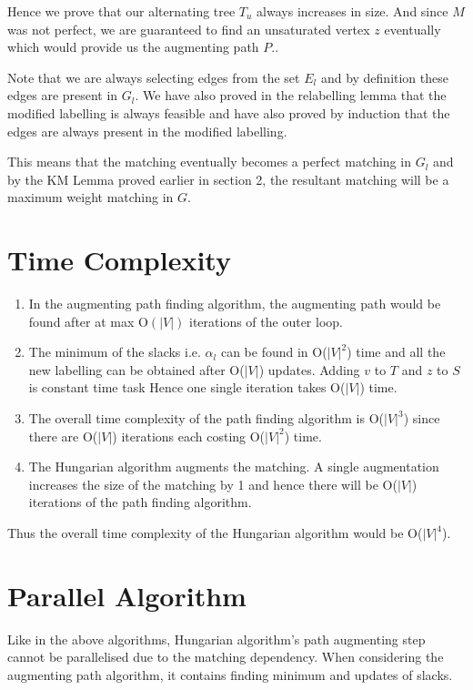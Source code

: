 Hence we prove that our alternating tree $T_u$ always increases in size. And since $M$ was not perfect, we are guaranteed to find an unsaturated vertex $z$ eventually which would provide us the augmenting path $P$..

Note that we are always selecting edges from the set $E_l$ and by definition these edges are present in $G_l$. We have also proved in the relabelling lemma that the modified labelling is always feasible and have also proved by induction that the edges are always present in the modified labelling. 

This means that the matching eventually becomes a perfect matching in $G_l$ and by the KM Lemma proved earlier in section 2, the resultant matching will be a maximum weight matching in $G$.

\section{Time Complexity}
\begin{enumerate}
    \item In the augmenting path finding algorithm, the augmenting path would be found after at max O$(|V|)$ iterations of the outer loop.
    \item The minimum of the slacks i.e. $\alpha_l$ can be found in O($|V|^2$) time and all the new labelling can be obtained after O($|V|$) updates. Adding $v$ to $T$ and $z$ to $S$ is constant time task Hence one single iteration takes O($|V|$) time.
    \item The overall time complexity of the path finding algorithm is O($|V|^3$) since there are O($|V|$) iterations each costing O($|V|^2$) time.
    \item The Hungarian algorithm augments the matching. A single augmentation increases the size of the matching by 1 and hence there will be O($|V|$) iterations of the path finding algorithm.
\end{enumerate}
Thus the overall time complexity of the Hungarian algorithm would be O($|V|^4$).

\section{Parallel Algorithm}
Like in the above algorithms, Hungarian algorithm's path augmenting step cannot be parallelised due to the matching dependency. When considering the augmenting path algorithm, it contains finding minimum and updates of slacks.

